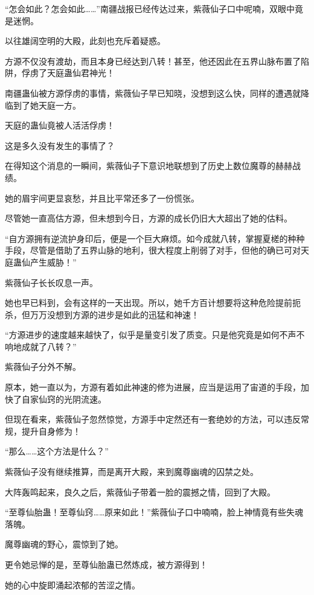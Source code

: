 
\begin{this_body}

“怎会如此？怎会如此……”南疆战报已经传达过来，紫薇仙子口中呢喃，双眼中竟是迷惘。

以往雄阔空明的大殿，此刻也充斥着疑惑。

方源不仅没有渡劫，而且本身已经达到八转！甚至，他还因此在五界山脉布置了陷阱，俘虏了天庭蛊仙君神光！

南疆蛊仙被方源俘虏的事情，紫薇仙子早已知晓，没想到这么快，同样的遭遇就降临到了她天庭一方。

天庭的蛊仙竟被人活活俘虏！

这是多久没有发生的事情了？

在得知这个消息的一瞬间，紫薇仙子下意识地联想到了历史上数位魔尊的赫赫战绩。

她的眉宇间更显哀愁，并且比平常还多了一份慌张。

尽管她一直高估方源，但未想到今日，方源的成长仍旧大大超出了她的估料。

“自方源拥有逆流护身印后，便是一个巨大麻烦。如今成就八转，掌握夏槎的种种手段，尽管是借助了五界山脉的地利，很大程度上削弱了对手，但他的确已可对天庭蛊仙产生威胁！”

紫薇仙子长长叹息一声。

她也早已料到，会有这样的一天出现。所以，她千方百计想要将这种危险提前扼杀，但万万没想到方源的进步是如此的迅猛和神速！

“方源进步的速度越来越快了，似乎是量变引发了质变。只是他究竟是如何不声不响地成就了八转？”

紫薇仙子分外不解。

原本，她一直以为，方源有着如此神速的修为进展，应当是运用了宙道的手段，加快了自家仙窍的光阴流速。

但现在看来，紫薇仙子忽然惊觉，方源手中定然还有一套绝妙的方法，可以违反常规，提升自身修为！

“那么……这个方法是什么？”

紫薇仙子没有继续推算，而是离开大殿，来到魔尊幽魂的囚禁之处。

大阵轰鸣起来，良久之后，紫薇仙子带着一脸的震撼之情，回到了大殿。

“至尊仙胎蛊！至尊仙窍……原来如此！”紫薇仙子口中喃喃，脸上神情竟有些失魂落魄。

魔尊幽魂的野心，震惊到了她。

更令她忌惮的是，至尊仙胎蛊已然炼成，被方源得到！

她的心中旋即涌起浓郁的苦涩之情。


\end{this_body}

